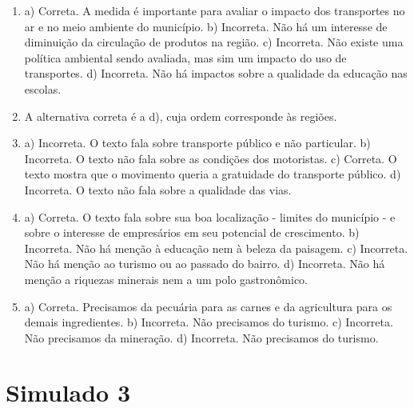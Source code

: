 \begin{enumerate}
\item
a) Correta. A medida é importante para avaliar o impacto dos transportes
no ar e no meio ambiente do município.
b) Incorreta. Não há um interesse de diminuição da circulação de
produtos na região.
c) Incorreta. Não existe uma política ambiental sendo avaliada, mas sim
um impacto do uso de transportes.
d) Incorreta. Não há impactos sobre a qualidade da educação nas escolas.

\item
A alternativa correta é a d), cuja ordem corresponde às regiões.

\item
a) Incorreta. O texto fala sobre transporte público e não particular.
b) Incorreta. O texto não fala sobre as condições dos motoristas.
c) Correta. O texto mostra que o movimento queria a gratuidade do
transporte público.
d) Incorreta. O texto não fala sobre a qualidade das vias.

\item
a) Correta. O texto fala sobre sua boa localização - limites do
município - e sobre o interesse de empresários em seu potencial de
crescimento.
b) Incorreta. Não há menção à educação nem à beleza da paisagem.
c) Incorreta. Não há menção ao turismo ou ao passado do bairro.
d) Incorreta. Não há menção a riquezas minerais nem a um polo
gastronômico.

\item
a) Correta. Precisamos da pecuária para as carnes e da agricultura para
os demais ingredientes.
b) Incorreta. Não precisamos do turismo.
c) Incorreta. Não precisamos da mineração.
d) Incorreta. Não precisamos do turismo.
\end{enumerate}

\section*{Simulado 3}

